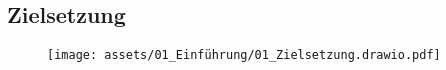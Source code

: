 \subsection{Zielsetzung}

\begin{figure}[H]
    \centering
    \texttt{[image: assets/01\_Einführung/01\_Zielsetzung.drawio.pdf]}
\end{figure}

\clearpage
